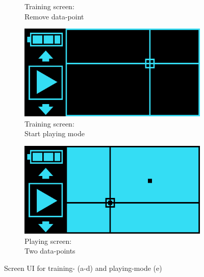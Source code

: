 \begin{figure}[H]
\begin{subfigure}[b]{0.19\textwidth}
        \caption{Training screen:\\Remove data-point\\\quad}
    \end{subfigure}
    \begin{subfigure}[b]{0.19\textwidth}
        \includegraphics[width=\linewidth]{overleaf/images/trainplay.png}
        \caption{Training screen:\\Start playing mode\\\quad}
    \end{subfigure}
    \begin{subfigure}[b]{0.19\textwidth}
        \includegraphics[width=\linewidth]{overleaf/images/play.png}
        \caption{Playing screen:\\Two data-points\\\quad}
    \end{subfigure}
    \vspace{\ftspace}
    \caption{Screen UI for training- (a-d) and playing-mode (e) \citep[from][p. 40-41]{dahal_designing_2024}}
    \label{fig:screen}
\end{figure}

